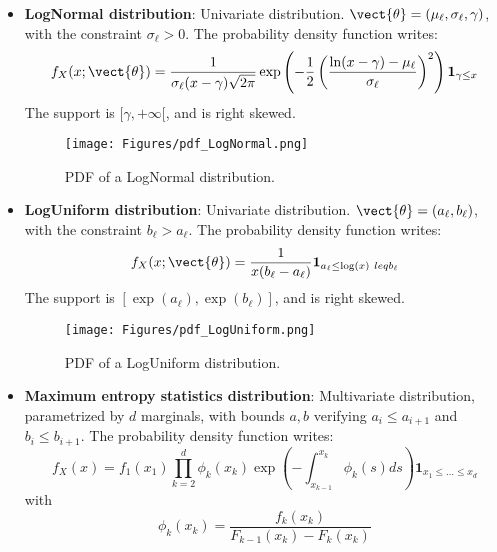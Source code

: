 {\begin{itemize}
\begin{figure}[H]
\begin{center}
\texttt{[image: Figures/pdf\_Logistic.png]}
\caption{PDF of a  logistic distribution.}
\end{center}
\end{figure}


\item {\bf LogNormal distribution}: Univariate distribution. $\vect{\theta} = \left(\mu_\ell,\sigma_\ell,\gamma \right)$, with the constraint $\sigma_\ell>0$. The probability density function writes:
\begin{equation}
f_X(x;\vect{\theta}) = \frac{1}{\sigma_\ell (x-\gamma) \sqrt{2\pi}} \exp \left( -\frac{1}{2} \left( \frac{\textrm{ln}(x-\gamma)-\mu_\ell}{\sigma_\ell}  \right)^2 \right) \mathbf{1}_{\gamma \leq x}
\end{equation}
The support is $[\gamma,+\infty[$, and is right skewed.

\begin{figure}[H]
\begin{center}
\texttt{[image: Figures/pdf\_LogNormal.png]}
\caption{PDF of a  LogNormal distribution.}
\end{center}
\end{figure}


\item {\bf LogUniform distribution}: Univariate distribution. $\vect{\theta} = \left(a_\ell,b_\ell\right)$, with the constraint $b_\ell>a_\ell$. The probability density function writes:
\begin{equation}
f_X(x;\vect{\theta}) = \frac{1}{x(b_\ell-a_\ell)}\mathbf{1}_{a_\ell \leq \log(x) \ leq b_\ell}
\end{equation}
The support is $[\exp(a_\ell),\exp(b_\ell)]$, and is right skewed.

\begin{figure}[H]
\begin{center}
\texttt{[image: Figures/pdf\_LogUniform.png]}
\caption{PDF of a  LogUniform distribution.}
\end{center}
\end{figure}

\item {\bf Maximum entropy statistics distribution}: Multivariate distribution, parametrized by $d$ marginals, with bounds $a,b$ verifying $a_i \leq a_{i+1}$ and $b_i \leq b_{i+1}$. The probability density function writes:
\begin{equation}
f_X(x) = f_1(x_1) \prod\limits_{k=2}^d \phi_k(x_k) \exp\left(-\int_{x_{k-1}}^{x_k} \phi_k(s) ds\right) \mathbf{1}_{x_1 \leq \dots \leq x_d}
\end{equation}
with
\begin{equation}
\phi_k(x_k) = \frac{f_k(x_k)}{F_{k-1}(x_k)-F_k(x_k)}
\end{equation}


\end{itemize}}
